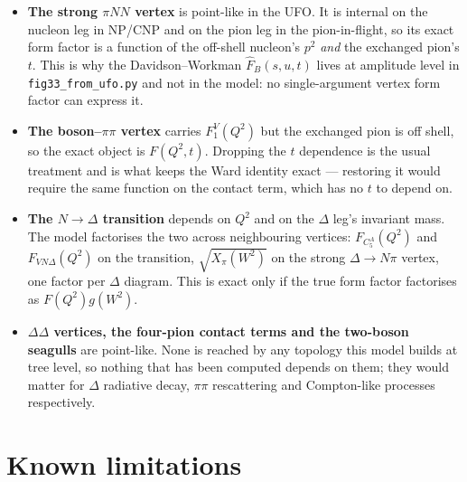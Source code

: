 \documentclass[11pt,a4paper]{article}
\newcommand{\code}[1]{\texttt{\small #1}}
\begin{document}
\begin{itemize}
\item \textbf{The strong $\pi NN$ vertex} is point-like in the UFO. It is
internal on the nucleon leg in NP/CNP and on the pion leg in the
pion-in-flight, so its exact form factor is a function of the off-shell
nucleon's $p^2$ \emph{and} the exchanged pion's $t$. This is why the
Davidson--Workman $\hat F_B(s,u,t)$ lives at amplitude level in
\code{fig33\_from\_ufo.py} and not in the model: no single-argument vertex form
factor can express it.

\item \textbf{The boson--$\pi\pi$ vertex} carries $F_1^V(Q^2)$ but the exchanged
pion is off shell, so the exact object is $F(Q^2,t)$. Dropping the $t$
dependence is the usual treatment and is what keeps the Ward identity exact ---
restoring it would require the same function on the contact term, which has no
$t$ to depend on.

\item \textbf{The $N\to\Delta$ transition} depends on $Q^2$ and on the $\Delta$
leg's invariant mass. The model factorises the two across neighbouring
vertices: $F_{C_5^A}(Q^2)$ and $F_{VN\Delta}(Q^2)$ on the transition,
$\sqrt{X_\pi(W^2)}$ on the strong $\Delta\to N\pi$ vertex, one factor per
$\Delta$ diagram. This is exact only if the true form factor factorises as
$F(Q^2)g(W^2)$.

\item \textbf{$\Delta\Delta$ vertices, the four-pion contact terms and the
two-boson seagulls} are point-like. None is reached by any topology this model
builds at tree level, so nothing that has been computed depends on them; they
would matter for $\Delta$ radiative decay, $\pi\pi$ rescattering and
Compton-like processes respectively.
\end{itemize}

\section{Known limitations}
\label{sec:limits}
\end{document}
